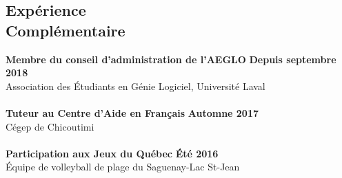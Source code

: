 \documentclass[margin,line]{resume}
\begin{document}
\begin{resume}
    \section{\mysidestyle Exp\'{e}rience\\Compl\'{e}mentaire}
     \textbf{Membre du conseil d'administration de l'AEGLO} \hfill \textbf{Depuis septembre 2018} \vspace{2mm}\\\vspace{1mm}%
    Association des \'{E}tudiants en G\'{e}nie Logiciel, Universit\'{e} Laval \\ \\
   \textbf{Tuteur au Centre d'Aide en Fran\c{c}ais} \hfill \textbf{Automne 2017} \vspace{2mm}\\\vspace{1mm}%
    C\'{e}gep de Chicoutimi \\ \\
    \textbf{Participation aux Jeux du Qu\'{e}bec} \hfill \textbf{\'{E}t\'{e} 2016} \vspace{2mm}\\\vspace{1mm}%
    \'{E}quipe de volleyball de plage du Saguenay-Lac St-Jean
    
    
    
\end{resume}
\end{document}
